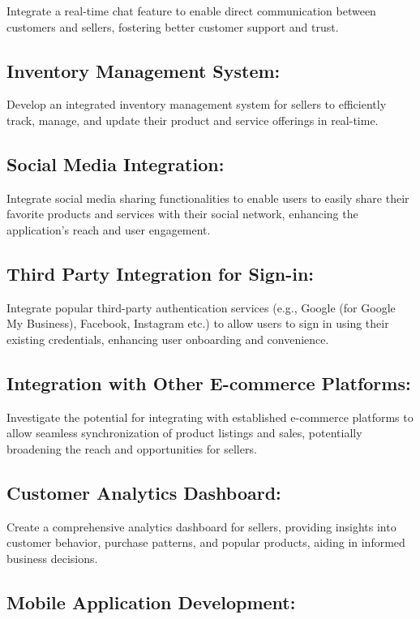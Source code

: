 Integrate a real-time chat feature to enable direct communication between customers and sellers, fostering better customer support and trust.

\subsection{Inventory Management System:}

Develop an integrated inventory management system for sellers to efficiently track, manage, and update their product and service offerings in real-time.

\subsection{Social Media Integration:}

Integrate social media sharing functionalities to enable users to easily share their favorite products and services with their social network, enhancing the application's reach and user engagement.

\subsection{Third Party Integration for Sign-in:}

Integrate popular third-party authentication services (e.g., Google (for Google My Business), Facebook, Instagram etc.) to allow users to sign in using their existing credentials, enhancing user onboarding and convenience.

\subsection{Integration with Other E-commerce Platforms:}

Investigate the potential for integrating with established e-commerce platforms to allow seamless synchronization of product listings and sales, potentially broadening the reach and opportunities for sellers.

\subsection{Customer Analytics Dashboard:}

Create a comprehensive analytics dashboard for sellers, providing insights into customer behavior, purchase patterns, and popular products, aiding in informed business decisions.

\subsection{Mobile Application Development:}

